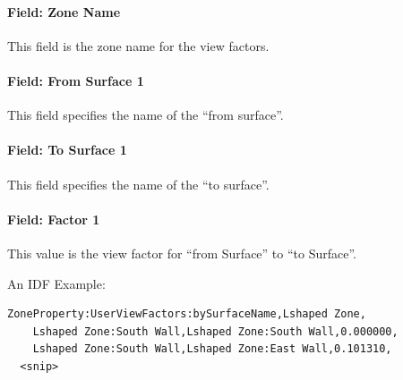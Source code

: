 \paragraph{Field: Zone Name}\label{field-zone-name}

This field is the zone name for the view factors.

\paragraph{Field: From Surface 1}\label{field-from-surface-1}

This field specifies the name of the ``from surface''.

\paragraph{Field: To Surface 1}\label{field-to-surface-1}

This field specifies the name of the ``to surface''.

\paragraph{Field: Factor 1}\label{field-factor-1}

This value is the view factor for ``from Surface'' to ``to Surface''.

An IDF Example:

\begin{lstlisting}
ZoneProperty:UserViewFactors:bySurfaceName,Lshaped Zone,
    Lshaped Zone:South Wall,Lshaped Zone:South Wall,0.000000,
    Lshaped Zone:South Wall,Lshaped Zone:East Wall,0.101310,
  <snip>
\end{lstlisting}
